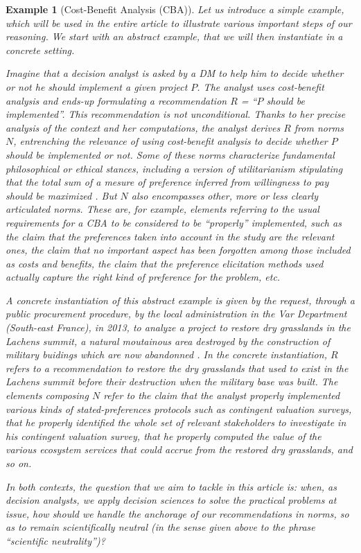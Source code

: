 \documentclass[preprint, french, english, 11pt, authoryear]{elsarticle}%
\newtheorem{example}{Example}
\begin{document}
\begin{example}[Cost-Benefit Analysis (CBA)]
Let us introduce a simple example, which will be used in the entire article to illustrate various important steps of our reasoning. %
We start with an abstract example, that we will then instantiate in a concrete setting.

Imagine that a decision analyst is asked by a \ac{DM} to help him to decide whether or not he should implement a given project $P$.
The analyst uses cost-benefit analysis \citep{layard_cost-benefit_1994} and ends-up formulating a recommendation $R$ = “$P$ should be implemented”.
This recommendation is not unconditional. Thanks to her precise analysis of the context and her computations, the analyst derives $R$ from norms $N$, entrenching the relevance of using cost-benefit analysis to decide whether $P$ should be implemented or not. Some of these norms characterize fundamental philosophical or ethical stances, including a version of utilitarianism stipulating that the total sum of a mesure of preference inferred from willingness to pay should be maximized \citep{meinard_ethical_2016}. 
But $N$ also encompasses other, more or less clearly articulated norms. These are, for example, elements referring to the usual requirements for a CBA to be considered to be ``properly'' implemented, such as the claim that the preferences taken into account in the study are the relevant ones, the claim that no important aspect has been forgotten among those included as costs and benefits, the claim that the preference elicitation methods used actually capture the right kind of preference for the problem, etc.

A concrete instantiation of this abstract example is given by the request, through a public procurement procedure, by the local administration in the Var Department (South-east France), in 2013, to analyze a project to restore dry grasslands in the Lachens summit, a natural moutainous area destroyed by the construction of military buidings which are now abandonned \citep{meinard_etude_2015}.
In the concrete instantiation, $R$ refers to a recommendation to restore the dry grasslands that used to exist in the Lachens summit before their destruction when the military base was built. 
The elements composing $N$ refer to the claim that the analyst properly implemented various kinds of stated-preferences protocols such as contingent valuation surveys, that he properly identified the whole set of relevant stakeholders to investigate in his contingent valuation survey, that he properly computed the value of the various ecosystem services that could accrue from the restored dry grasslands, and so on.

In both contexts, the question that we aim to tackle in this article is: when, as decision analysts, we apply decision sciences to solve the practical problems at issue, how should we handle the anchorage of our recommendations in norms, so as to remain scientifically neutral (in the sense given above to the phrase ``scientific neutrality'')? 
\end{example}
\end{document}
